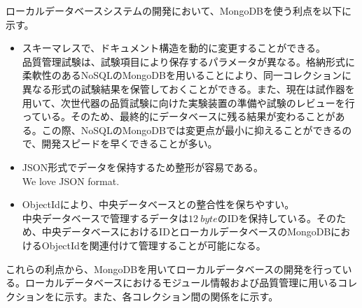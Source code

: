 ローカルデータベースシステムの開発において、MongoDBを使う利点を以下に示す。
\begin{itemize}
  \item スキーマレスで、ドキュメント構造を動的に変更することができる。 \\
  品質管理試験は、試験項目により保存するパラメータが異なる。格納形式に柔軟性のあるNoSQLのMongoDBを用いることにより、同一コレクションに異なる形式の試験結果を保管しておくことができる。また、現在は試作器を用いて、次世代器の品質試験に向けた実験装置の準備や試験のレビューを行っている。そのため、最終的にデータベースに残る結果が変わることがある。この際、NoSQLのMongoDBでは変更点が最小に抑えることができるので、開発スピードを早くできることが多い。
  \item JSON形式でデータを保持するため整形が容易である。\\
  We love JSON format.
  \item ObjectIdにより、中央データベースとの整合性を保ちやすい。 \\
  中央データベースで管理するデータは$12\ \si{byte}$のIDを保持している。そのため、中央データベースにおけるIDとローカルデータベースのMongoDBにおけるObjectIdを関連付けて管理することが可能になる。
\end{itemize}

これらの利点から、MongoDBを用いてローカルデータベースの開発を行っている。ローカルデータベースにおけるモジュール情報および品質管理に用いるコレクションをに示す。また、各コレクション間の関係をに示す。


